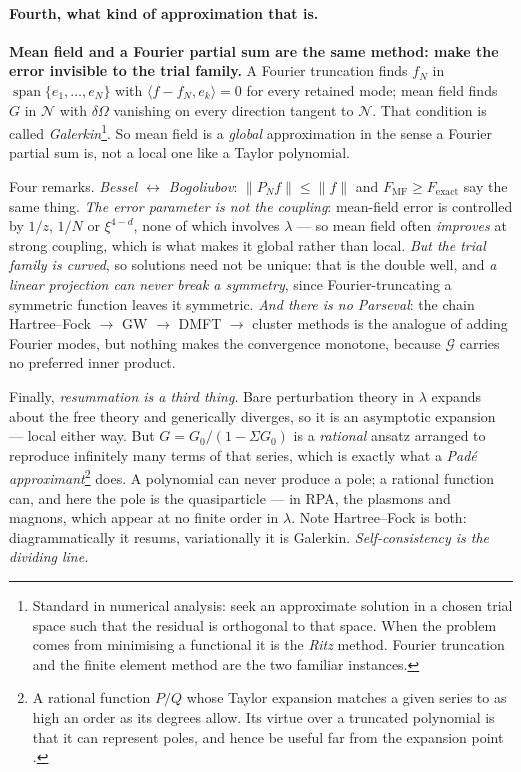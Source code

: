 \documentclass[10pt,a4paper]{article}
\DeclareMathOperator{\Span}{span}
\newcommand{\pair}[2]{\langle #1 , #2 \rangle}
\theoremstyle{plain}
\theoremstyle{definition}
\numberwithin{equation}{section}
\begin{document}
\paragraph{Fourth, what kind of approximation that is.}

\begin{keybox}
\textbf{Mean field and a Fourier partial sum are the same method: make the error invisible to
the trial family.} A Fourier truncation finds $f_N$ in $\Span\{e_1,\dots,e_N\}$ with
$\pair{f-f_N}{e_k}=0$ for every retained mode; mean field finds $G$ in $\mathcal N$ with
$\delta\Omega$ vanishing on every direction tangent to $\mathcal N$. That condition is called
\emph{Galerkin}\footnote{Standard in numerical analysis: seek an approximate solution in a
chosen trial space such that the residual is orthogonal to that space. When the problem comes
from minimising a functional it is the \emph{Ritz} method. Fourier truncation and the finite
element method are the two familiar instances.}. So mean field is a \emph{global} approximation
in the sense a Fourier partial sum is, not a local one like a Taylor polynomial.
\end{keybox}

\noindent Four remarks. \emph{Bessel $\leftrightarrow$ Bogoliubov}: $\|P_Nf\|\le\|f\|$ and
$F_{\mathrm{MF}}\ge F_{\mathrm{exact}}$ say the same thing. \emph{The error parameter is not the
coupling}: mean-field error is controlled by $1/z$, $1/N$ or $\xi^{4-d}$, none of which involves
$\lambda$ --- so mean field often \emph{improves} at strong coupling, which is what makes it
global rather than local. \emph{But the trial family is curved}, so solutions need not be
unique: that is the double well, and \emph{a linear projection can never break a symmetry},
since Fourier-truncating a symmetric function leaves it symmetric. \emph{And there is no
Parseval}: the chain Hartree--Fock $\to$ GW $\to$ DMFT $\to$ cluster methods is the analogue of
adding Fourier modes, but nothing makes the convergence monotone, because $\mathcal G$ carries no
preferred inner product.

Finally, \emph{resummation is a third thing}. Bare perturbation theory in $\lambda$ expands
about the free theory and generically diverges, so it is an asymptotic expansion --- local
either way. But $G=G_0/(1-\Sigma G_0)$ is a \emph{rational} ansatz arranged to reproduce
infinitely many terms of that series, which is exactly what a \emph{Pad\'e
approximant}\footnote{A rational function $P/Q$ whose Taylor expansion matches a given series to
as high an order as its degrees allow. Its virtue over a truncated polynomial is that it can
represent poles, and hence be useful far from the expansion point \cite{BenderOrszag}.} does. A
polynomial can never produce a pole; a rational function can, and here the pole is the
quasiparticle --- in RPA, the plasmons and magnons, which appear at no finite order in $\lambda$.
Note Hartree--Fock is both: diagrammatically it resums, variationally it is Galerkin.
\emph{Self-consistency is the dividing line.}
\end{document}
